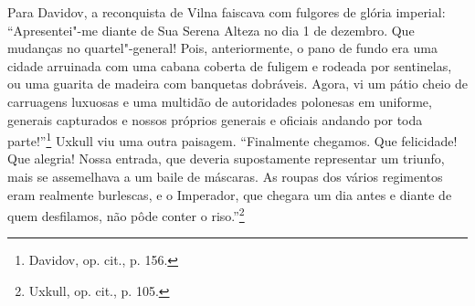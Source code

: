 Para Davidov, a reconquista de Vilna faiscava com fulgores de glória
imperial: ``Apresentei"-me diante de Sua Serena Alteza no dia 1 de
dezembro. Que mudanças no quartel"-general! Pois, anteriormente, o pano
de fundo era uma cidade arruinada com uma cabana coberta de fuligem e
rodeada por sentinelas, ou uma guarita de madeira com banquetas
dobráveis. Agora, vi um pátio cheio de carruagens luxuosas e uma
multidão de autoridades polonesas em uniforme, generais capturados e
nossos próprios generais e oficiais andando por toda parte!''\footnote{Davidov, op. cit., p. 156.} Uxkull viu uma outra paisagem. ``Finalmente chegamos. Que felicidade! Que alegria! Nossa entrada, que deveria
supostamente representar um triunfo, mais se assemelhava a um baile de
máscaras. As roupas dos vários regimentos eram realmente burlescas, e o
Imperador, que chegara um dia antes e diante de quem desfilamos, não
pôde conter o riso.''\footnote{Uxkull, op. cit., p. 105.}

%

